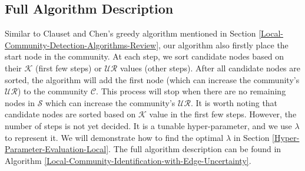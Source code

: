 \documentclass[\main/thesis.tex]{subfiles}
\begin{document}
\subsection{Full Algorithm Description} \label{Full-Algorithm-Description-local}
Similar to Clauset and Chen's greedy algorithm mentioned in Section \ref{Local-Community-Detection-Algorithms-Review}, our algorithm also firstly place the start node in the community. At each step, we sort candidate nodes based on their $\mathcal{K}$ (first few steps) or $\mathcal{UR}$ values (other steps). After all candidate nodes are sorted, the algorithm will add the first node (which can increase the community's $\mathcal{UR}$) to the community $\mathcal{C}$. This process will stop when there are no remaining nodes in $\mathcal{S}$ which can increase the community's $\mathcal{UR}$. It is worth noting that candidate nodes are sorted based on $\mathcal{K}$ value in the first few steps. However, the number of steps is not yet decided. It is a tunable hyper-parameter, and we use $\lambda$ to represent it. We will demonstrate how to find the optimal $\lambda$ in Section \ref{Hyper-Parameter-Evaluation-Local}. The full algorithm description can be found in Algorithm \ref{Local-Community-Identification-with-Edge-Uncertainty}.
\end{document}
